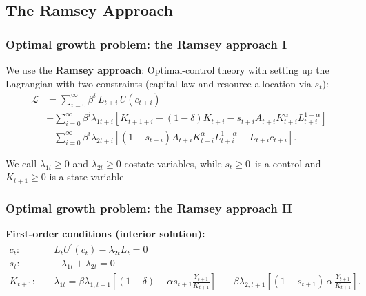 \documentclass[xcolor=x11names,compress,aspectratio=169]{beamer}%
\begin{document}
\subsection{The Ramsey Approach}%

\begin{frame}%
%

\frametitle{Optimal growth problem: the Ramsey approach I}%


We use the \textbf{Ramsey approach}: Optimal-control theory with setting up
the Lagrangian with two constraints (capital law and resource allocation via
$s_{t}$):
\begin{align*}
\mathcal{L}  &  =\sum\nolimits_{i=0}^{\infty}\beta^{i}\,L_{t+i}\,U(c_{t+i})\\
&  +\sum\nolimits_{i=0}^{\infty}\beta^{i}\lambda_{1t+i}\left[  K_{t+1+i}%
-(1-\delta)K_{t+i}-s_{t+i}A_{t+i}K_{t+i}^{\alpha}L_{t+i}^{1-\alpha}\right] \\
&  +\sum\nolimits_{i=0}^{\infty}\beta^{i}\lambda_{2t+i}\left[  (1-s_{t+i}%
)A_{t+i}K_{t+i}^{\alpha}L_{t+i}^{1-\alpha}-L_{t+i}c_{t+i}\right]  .
\end{align*}


We call $\lambda_{1t}\geq0$ and $\lambda_{2t}\geq0$ costate variables, while
$s_{t}\geq0$\ is a control and $K_{t+1}\geq0$ is a state variable%

\transboxout
\end{frame}%
%

\begin{frame}%
%

\frametitle{Optimal growth problem: the Ramsey approach II}%


\textbf{First-order conditions (interior solution):}
\begin{align*}
c_{t}:\quad &  L_{t}U^{\prime}(c_{t})-\lambda_{2t}L_{t}=0\\[0.4cm]
s_{t}:\quad &  -\lambda_{1t}+\lambda_{2t}=0\\[0.4cm]
K_{t+1}:\quad &  \lambda_{1t}=\beta\lambda_{1,t+1}\left[  (1-\delta)+\alpha
s_{t+1}\tfrac{Y_{t+1}}{K_{t+1}}\right]  \;-\;\beta\lambda_{2,t+1}\left[
(1-s_{t+1})\,\alpha\,\tfrac{Y_{t+1}}{K_{t+1}}\right]  .
\end{align*}
%

\transboxout
\end{frame}%
%
\end{document}
